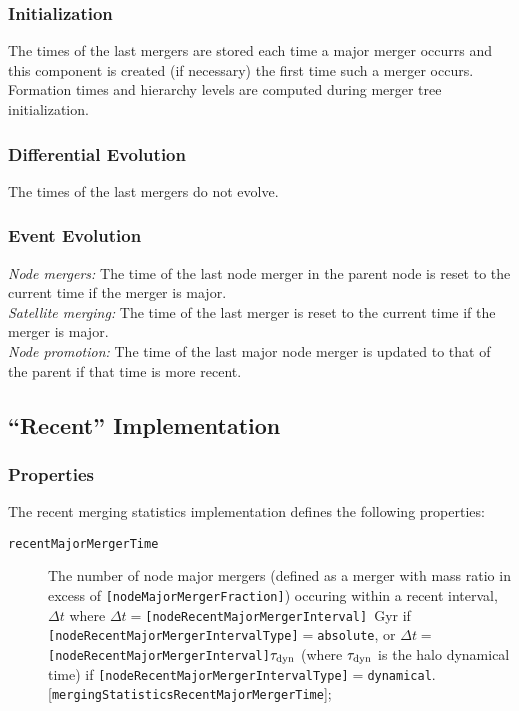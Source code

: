 \subsubsection{Initialization}

The times of the last mergers are stored each time a major merger occurrs and this \gls{component} is created (if necessary) the first time such a merger occurs. Formation times and hierarchy levels are computed during merger tree initialization.

\subsubsection{Differential Evolution}

The times of the last mergers do not evolve.

\subsubsection{Event Evolution}

\noindent\emph{Node mergers:} The time of the last \gls{node} merger in the parent \gls{node} is reset to the current time if the merger is major.\\

\noindent\emph{Satellite merging:} The time of the last merger is reset to the current time if the merger is major.\\

\noindent\emph{Node promotion:} The time of the last major \gls{node} merger is updated to that of the parent if that time is more recent.\\

\subsection{``Recent'' Implementation}

\subsubsection{Properties}

The recent merging statistics implementation defines the following properties:
\begin{description}
 \item [{\tt recentMajorMergerTime}] The number of node major mergers (defined as a merger with mass ratio in excess of {\tt [nodeMajorMergerFraction]}) occuring within a recent interval, $\Delta t$ where $\Delta t = ${\tt [nodeRecentMajorMergerInterval]}~Gyr if {\tt [nodeRecentMajorMergerIntervalType]}$=${\tt absolute}, or $\Delta t = ${\tt [nodeRecentMajorMergerInterval]}$\tau_{\rm dyn}$ (where $\tau_{\rm dyn}$ is the halo dynamical time) if {\tt [nodeRecentMajorMergerIntervalType]}$=${\tt dynamical}. [{\tt mergingStatisticsRecentMajorMergerTime}];
\end{description}

